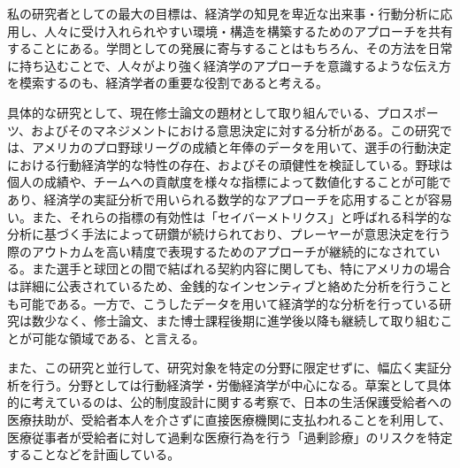 \documentclass[dvipdfmx, 12pt]{jsarticle}
\begin{document}
私の研究者としての最大の目標は、経済学の知見を卑近な出来事・行動分析に応用し、人々に受け入れられやすい環境・構造を構築するためのアプローチを共有することにある。学問としての発展に寄与することはもちろん、その方法を日常に持ち込むことで、人々がより強く経済学のアプローチを意識するような伝え方を模索するのも、経済学者の重要な役割であると考える。

具体的な研究として、現在修士論文の題材として取り組んでいる、プロスポーツ、およびそのマネジメントにおける意思決定に対する分析がある。この研究では、アメリカのプロ野球リーグの成績と年俸のデータを用いて、選手の行動決定における行動経済学的な特性の存在、およびその頑健性を検証している。野球は個人の成績や、チームへの貢献度を様々な指標によって数値化することが可能であり、経済学の実証分析で用いられる数学的なアプローチを応用することが容易い。また、それらの指標の有効性は「セイバーメトリクス」と呼ばれる科学的な分析に基づく手法によって研鑽が続けられており、プレーヤーが意思決定を行う際のアウトカムを高い精度で表現するためのアプローチが継続的になされている。また選手と球団との間で結ばれる契約内容に関しても、特にアメリカの場合は詳細に公表されているため、金銭的なインセンティブと絡めた分析を行うことも可能である。一方で、こうしたデータを用いて経済学的な分析を行っている研究は数少なく、修士論文、また博士課程後期に進学後以降も継続して取り組むことが可能な領域である、と言える。

また、この研究と並行して、研究対象を特定の分野に限定せずに、幅広く実証分析を行う。分野としては行動経済学・労働経済学が中心になる。草案として具体的に考えているのは、公的制度設計に関する考察で、日本の生活保護受給者への医療扶助が、受給者本人を介さずに直接医療機関に支払われることを利用して、医療従事者が受給者に対して過剰な医療行為を行う「過剰診療」のリスクを特定することなどを計画している。
\end{document}
